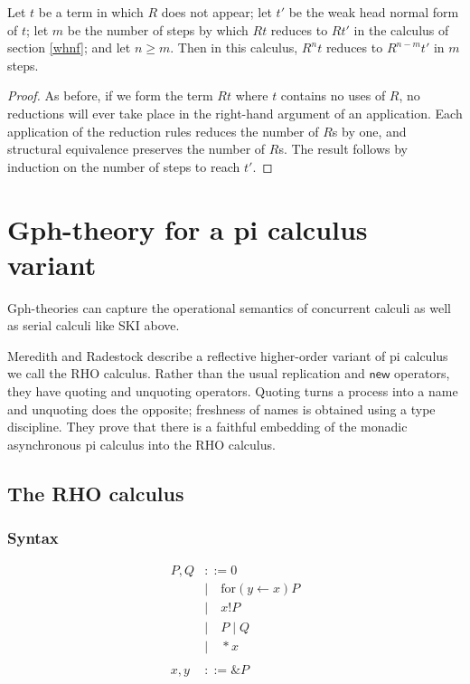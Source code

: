 \documentclass[a4paper,UKenglish]{lipics-v2016}
\newcommand{\new}{\mathsf{new}}
\newcommand{\for}{\mathrm{for }}
\newcommand{\from}{\leftarrow}
\begin{document}
\begin{theorem}
  Let $t$ be a term in which $R$ does not appear; let $t'$ be the weak head normal form of $t$; let $m$ be the number of steps by which $Rt$ reduces to $Rt'$ in the calculus of section \ref{whnf}; and let $n\ge m$.  Then in this calculus, $R^n t$ reduces to $R^{n-m}t'$ in $m$ steps.
\end{theorem}

\begin{proof}
As before, if we form the term $Rt$ where $t$ contains no uses of $R$, no reductions will ever take place in the right-hand argument of an application.  Each application of the reduction rules reduces the number of $R$s by one, and structural equivalence preserves the number of $R$s.  The result follows by induction on the number of steps to reach $t'.$
\end{proof}

\section{Gph-theory for a pi calculus variant}
\label{rhocomb}
Gph-theories can capture the operational semantics of concurrent calculi as well as serial calculi like SKI above.

  Meredith and Radestock \cite{DBLP:journals/entcs/MeredithR05} describe a reflective higher-order variant of pi calculus we call the RHO calculus.  Rather than the usual replication and $\new$ operators, they have quoting and unquoting operators.  Quoting turns a process into a name and unquoting does the opposite; freshness of names is obtained using a type discipline.  They prove that there is a faithful embedding of the monadic asynchronous pi calculus into the RHO calculus.

\subsection{The RHO calculus}
\subsubsection{Syntax}
\[\begin{array}{rl}
  P, Q &::= 0 \\ 
  &| \quad \for(y \from x)P \\ 
  &| \quad x!P \\ 
  &| \quad P \;|\; Q \\
  &| \quad *x \\ 
  &\\
  x, y &::= \&P \\ 
\end{array}\]
\end{document}
